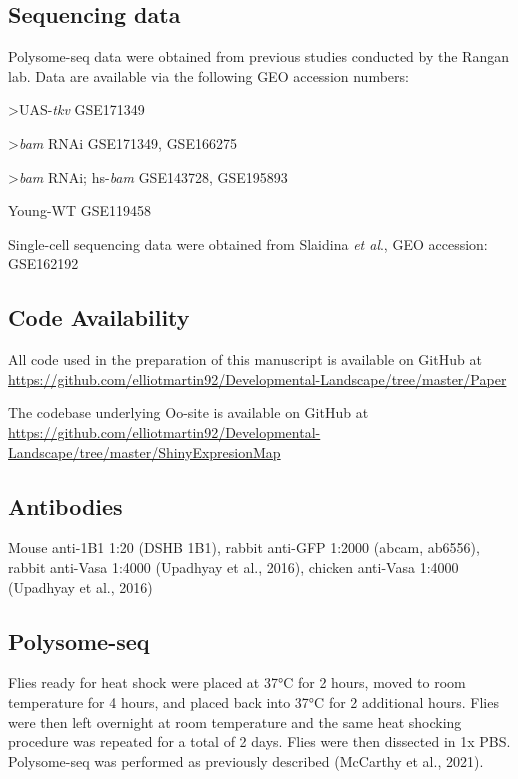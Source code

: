\documentclass[12pt,oneside]{reedthesis}
\begin{document}
\hypertarget{sequencing-data}{%
\subsection{Sequencing data}\label{sequencing-data}}

Polysome-seq data were obtained from previous studies conducted by the
Rangan lab. Data are available via the following GEO accession numbers:

\textgreater UAS-\emph{tkv} GSE171349

\textgreater{}\emph{bam} RNAi GSE171349, GSE166275

\textgreater{}\emph{bam} RNAi; hs-\emph{bam} GSE143728, GSE195893

Young-WT GSE119458

Single-cell sequencing data were obtained from Slaidina \emph{et al}., GEO
accession: GSE162192

\hypertarget{code-availability}{%
\subsection{Code Availability}\label{code-availability}}

All code used in the preparation of this manuscript is available on
GitHub at
\url{https://github.com/elliotmartin92/Developmental-Landscape/tree/master/Paper}

The codebase underlying Oo-site is available on GitHub at
\url{https://github.com/elliotmartin92/Developmental-Landscape/tree/master/ShinyExpresionMap}

\hypertarget{antibodies}{%
\subsection{Antibodies}\label{antibodies}}

Mouse anti-1B1 1:20 (DSHB 1B1), rabbit anti-GFP 1:2000 (abcam, ab6556),
rabbit anti-Vasa 1:4000
(Upadhyay et al., 2016), chicken anti-Vasa
1:4000 (Upadhyay et al., 2016)

\hypertarget{polysome-seq-1}{%
\subsection{Polysome-seq}\label{polysome-seq-1}}

Flies ready for heat shock were placed at 37°C for 2 hours, moved to
room temperature for 4 hours, and placed back into 37°C for 2 additional
hours. Flies were then left overnight at room temperature and the same
heat shocking procedure was repeated for a total of 2 days. Flies were
then dissected in 1x PBS. Polysome-seq was performed as previously
described (McCarthy et al., 2021).
\end{document}
